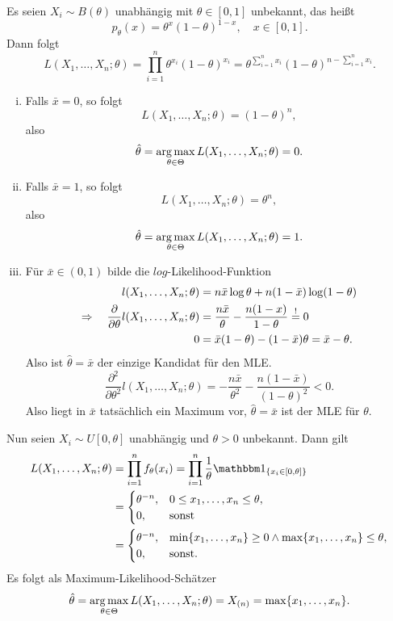 \begin{exmp} %
  Es seien $X_i \sim B(\theta)$ unabhängig mit $\theta \in [0,1]$ unbekannt, das
  heißt
  \[ p_\theta(x) = \theta^x (1-\theta)^{1-x}, \quad x \in [0,1].\]
  Dann folgt
  \[ L(X_1, \ldots, X_n; \theta) = \prod_{i=1}^n \theta^{x_i}(1-\theta)^{x_i}
    = \theta^{\sum_{i=1}^n x_i} (1-\theta)^{n - \sum_{i=1}^n x_i}. \]
  \begin{enumerate}[i)]
  \item Falls $\bar{x} = 0$, so folgt
    \[ L(X_1, \ldots, X_n; \theta) = (1-\theta)^n, \]
    also
    \[ \hat{\theta} = \operatorname*{arg\,max}_{\theta \in \Theta} L(X_1, \ldots, X_n; \theta) =
      0. \]
  \item Falls $\bar{x} = 1$, so folgt
    \[ L(X_1, \ldots, X_n; \theta) = \theta^n, \]
    also
    \[ \hat{\theta} = \operatorname*{arg\,max}_{\theta \in \Theta} L(X_1, \ldots, X_n; \theta) =
      1. \]
  \item Für $\bar{x} \in (0,1)$ bilde die $log$-Likelihood-Funktion
    \begin{align*}
      l(X_1, \ldots, X_n; \theta)
      &= n \bar{x} \log \theta + n (1-\bar{x}) \log (1-\theta) \\
      \Rightarrow \quad \frac{\partial }{\partial \theta} l(X_1, \ldots, X_n; \theta)
      &= \frac{n \bar{x}}{\theta} - \frac{n(1-x)}{1-\theta} \overset{!}{=} 0 \\
      0
      &= \bar{x}(1-\theta) - (1-\bar{x})\theta = \bar{x} - \theta.
    \end{align*}
    Also ist $\hat{\theta} = \bar{x}$ der einzige Kandidat für den MLE.
    \[ \frac{\partial^2}{\partial \theta^2} l(X_1, \ldots, X_n; \theta)
      = - \frac{n \bar{x}}{\theta^2} - \frac{n(1 - \bar{x})}{(1-\theta)^2} <
      0. \]
    Also liegt in $\bar{x}$ tatsächlich ein Maximum vor, $\hat{\theta} =
    \bar{x}$ ist der MLE für $\theta$.
  \end{enumerate}
  Nun seien $X_i \sim U[0, \theta]$ unabhängig und $\theta > 0$ unbekannt. Dann
  gilt
  \begin{align*}
    L(X_1, \ldots, X_n; \theta)
    &= \prod_{i=1}^n f_\theta(x_i)
      = \prod_{i=1}^n \rez{\theta} \ind_{\{ x_i \in [0,\theta]\}} \\
    &= \begin{cases}
      \theta^{-n}, &0 \le x_1, \ldots, x_n \le \theta, \\
      0, &\text{sonst}
    \end{cases} \\
    &= \begin{cases}
      \theta^{-n}, &\min \{x_1, \ldots, x_n \} \ge 0
      \wedge \max \{ x_1, \ldots, x_n \}\le \theta, \\
      0, &\text{sonst.}
    \end{cases}
  \end{align*}
  Es folgt als Maximum-Likelihood-Schätzer
  \[ \hat{\theta} = \operatorname*{arg\,max}_{\theta \in \Theta} L(X_1, \ldots, X_n; \theta) =
    X_{(n)} = \max \{ x_1, \ldots, x_n \}. \]
\end{exmp}

